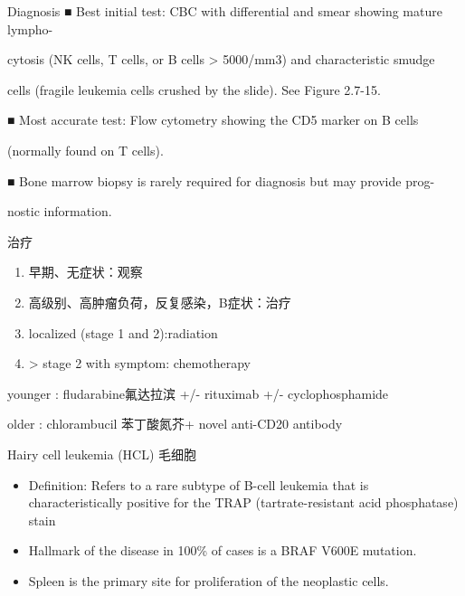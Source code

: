\documentclass[
  ignorenonframetext,
]{beamer}
\begin{document}
\begin{frame}
\begin{block}{Diagnosis}
\protect\hypertarget{diagnosis-2}{}
■ Best initial test: CBC with differential and smear showing mature
lympho-

cytosis (NK cells, T cells, or B cells \textgreater{} 5000/mm3) and
characteristic smudge

cells (fragile leukemia cells crushed by the slide). See Figure 2.7-15.

■ Most accurate test: Flow cytometry showing the CD5 marker on B cells

(normally found on T cells).

■ Bone marrow biopsy is rarely required for diagnosis but may provide
prog-

nostic information.
\end{block}
\end{frame}

\begin{frame}
\begin{block}{治疗}
\protect\hypertarget{ux6cbbux7597-8}{}
\begin{enumerate}
\item
  早期、无症状：观察
\item
  高级别、高肿瘤负荷，反复感染，B症状：治疗
\item
  localized (stage 1 and 2):radiation
\item
  \textgreater{} stage 2 with symptom: chemotherapy
\end{enumerate}

younger : fludarabine氟达拉滨 +/- rituximab +/- cyclophosphamide

older : chlorambucil 苯丁酸氮芥+ novel anti-CD20 antibody
\end{block}
\end{frame}

\begin{frame}
\begin{block}{Hairy cell leukemia (HCL) 毛细胞}
\protect\hypertarget{hairy-cell-leukemia-hcl-ux6bdbux7ec6ux80de}{}
\begin{itemize}
\item
  Definition: Refers to a rare subtype of B-cell leukemia that is
  characteristically positive for the TRAP (tartrate-resistant acid
  phosphatase) stain
\item
  Hallmark of the disease in 100\% of cases is a BRAF V600E mutation.
\item
  Spleen is the primary site for proliferation of the neoplastic cells.
\end{itemize}
\end{block}
\end{frame}
\end{document}
